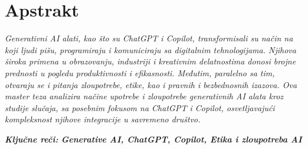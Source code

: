 \section*{Apstrakt}
\begin{tcolorbox}[colback=apstrakt_color!10, colframe=apstrakt_color]
\justifying
\textit{Generativni AI alati, kao što su ChatGPT i Copilot, transformisali su način na koji ljudi pišu, programiraju i komuniciraju sa digitalnim tehnologijama. Njihova široka primena u obrazovanju, industriji i kreativnim delatnostima donosi brojne prednosti u pogledu produktivnosti i efikasnosti. Međutim, paralelno sa tim, otvaraju se i pitanja zloupotrebe, etike, kao i pravnih i bezbednosnih izazova. Ova master teza analizira načine upotrebe i zloupotrebe generativnih AI alata kroz studije slučaja, sa posebnim fokusom na ChatGPT i Copilot, osvetljavajući kompleksnost njihove integracije u savremeno društvo.}

\vspace{0.3cm}
\small \textbf{\textit{Ključne reči:} \textit{Generative AI, ChatGPT, Copilot, Etika i zloupotreba AI}}
\end{tcolorbox}
